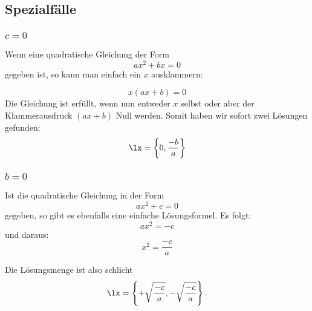 \subsection{Spezialfälle}


\subsubsection{$c=0$}
Wenn eine quadratische Gleichung der Form
$$ax^2 +bx = 0$$
gegeben ist, so kann man einfach ein $x$ ausklammern:

$$x(ax+b)=0$$
 Die Gleichung ist erfüllt, wenn nun entweder $x$ selbst oder aber
 der Klammerausdruck $(ax+b)$ Null werden. Somit haben wir sofort zwei
 Lösungen gefunden:
 $$\lx=\left\{0, \frac{-b}{a}\right\}$$

 \newpage

 
 \subsubsection{$b=0$}
 Ist die quadratische Gleichung in der Form
 $$ax^2 + c = 0$$
 gegeben, so gibt es ebenfalls eine einfache Lösungsformel. Es folgt:
 $$ax^2 = -c$$
 und daraus:
 $$x^2 = \frac{-c}{a}$$

 Die Lösungsmenge ist also schlicht
 $$\lx=\left\{ + \sqrt{\frac{-c}{a}}, -\sqrt{\frac{-c}{a}} \right\}.$$

\newpage
